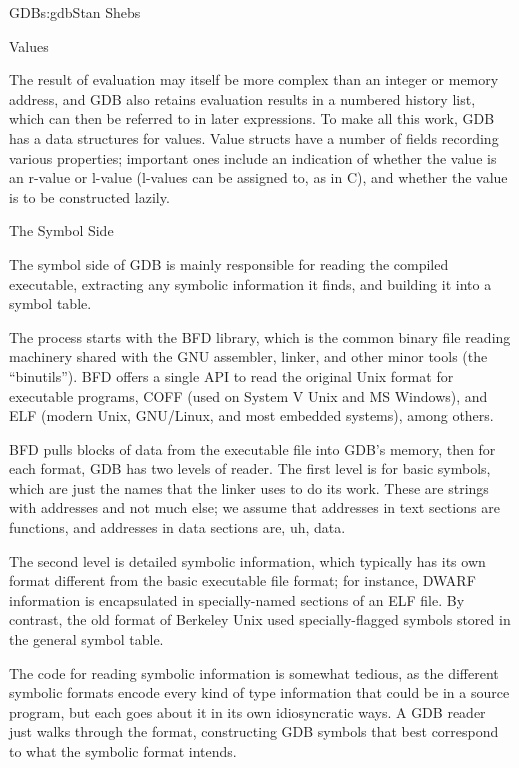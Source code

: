 \begin{aosachapter}{GDB}{s:gdb}{Stan Shebs}
\begin{aosasect2}{Values}

The result of evaluation may itself be more complex than an integer or
memory address, and GDB also retains evaluation results in a numbered
history list, which can then be referred to in later expressions.  To
make all this work, GDB has a data structures for values.  Value
structs have a number of fields recording various properties;
important ones include an indication of whether the value is an
r-value or l-value (l-values can be assigned to, as in C), and whether
the value is to be constructed lazily.

\end{aosasect2}

\begin{aosasect1}{The Symbol Side}

The symbol side of GDB is mainly responsible for reading the compiled
executable, extracting any symbolic information it finds, and building
it into a symbol table.

The process starts with the BFD library, which is the common binary
file reading machinery shared with the GNU assembler, linker, and
other minor tools (the ``binutils'').  BFD offers a single API to read
the original Unix  format for executable programs, COFF (used on
System V Unix and MS Windows), and ELF (modern Unix, GNU/Linux, and
most embedded systems), among others.

BFD pulls blocks of data from the executable file into GDB's memory,
then for each format, GDB has two levels of reader.  The first level
is for basic symbols, which are just the names that the linker uses to
do its work.  These are strings with addresses and not much else; we
assume that addresses in text sections are functions, and addresses in
data sections are, uh, data.

The second level is detailed symbolic information, which typically has
its own format different from the basic executable file format; for
instance, DWARF information is encapsulated in specially-named
sections of an ELF file.  By contrast, the old  format of
Berkeley Unix used specially-flagged symbols stored in the general
symbol table.

The code for reading symbolic information is somewhat tedious, as the
different symbolic formats encode every kind of type information that
could be in a source program, but each goes about it in its own
idiosyncratic ways.  A GDB reader just walks through the format,
constructing GDB symbols that best correspond to what the symbolic
format intends.


\end{aosasect1}
\end{aosachapter}

